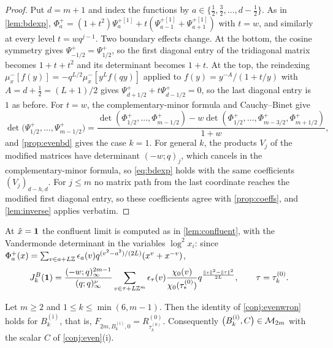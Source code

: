 \begin{proof}
Put $d=m+1$ and index the functions by $a\in\{\frac12,\frac32,\dots,d-\frac12\}$. As in \cref{lem:bdexp}, $\Phi^+_a=(1+t^2)\Psi^{+[1]}_a+t(\Psi^{+[1]}_{a-1}+\Psi^{+[1]}_{a+1})$ with $t=w$, and similarly at every level $t=wq^{j-1}$. Two boundary effects change. At the bottom, the cosine symmetry gives $\Psi^+_{-1/2}=\Psi^+_{1/2}$, so the first diagonal entry of the tridiagonal matrix becomes $1+t+t^2$ and its determinant becomes $1+t$. At the top, the reindexing $\mu^-_x[f(y)]=-q^{L/2}\mu^-_x[y^Lf(qy)]$ applied to $f(y)=y^{-A}/(1+t/y)$ with $A=d+\frac12=(L+1)/2$ gives $\Psi^+_{d+1/2}+t\Psi^+_{d-1/2}=0$, so the last diagonal entry is $1$ as before. For $t=w$, the complementary-minor formula and Cauchy--Binet give
\[
\det\bigl(\Psi^+_{1/2},\dots,\Psi^+_{m-1/2}\bigr)=\frac{\det(\Phi^+_{1/2},\dots,\Phi^+_{m-1/2})-w\det(\Phi^+_{1/2},\dots,\Phi^+_{m-3/2},\Phi^+_{m+1/2})}{1+w},
\]
and \cref{prop:evenbd} gives the case $k=1$. For general $k$, the products $V_j$ of the modified matrices have determinant $(-w;q)_j$, which cancels in the complementary-minor formula, so \eqref{eq:bdexp} holds with the same coefficients $(V_j)_{d-h,d}$. For $j\le m$ no matrix path from the last coordinate reaches the modified first diagonal entry, so these coefficients agree with \cref{prop:coeffs}, and \cref{lem:inverse} applies verbatim.
\end{proof}

At $\hat x=\mathbf{1}$ the confluent limit is computed as in \cref{lem:confluent}, with the Vandermonde determinant in the variables $\log^2x_i$: since $\Phi^+_a(x)=\sum_{v\in a+L\mathbb{Z}}\epsilon_a(v)q^{(v^2-a^2)/(2L)}(x^v+x^{-v})$,
\begin{equation}\label{eq:evenconf}
J^B_k(\mathbf{1})=\frac{(-w;q)_\infty^{2m-1}}{(q;q)_\infty^\nu}\sum_{v\in\tau+L\mathbb{Z}^m}\epsilon_\tau(v)\frac{\chi_0(v)}{\chi_0(\tau^{(0)}_*)}q^{\frac{\|v\|^2-\|\tau\|^2}{2L}},\qquad\tau=\tau^{(0)}_k.
\end{equation}

\begin{theorem}\label{thm:evencomp}
Let $m\ge2$ and $1\le k\le\min(6,m-1)$. Then the identity of \cref{conj:evenwron} holds for $B^{\mathrm{(i)}}_k$, that is, $F_{2m,B^{\mathrm{(i)}}_k,0}=R^{(0)}_{\tau^{(0)}_k}$. Consequently $\bigl(B^{\mathrm{(i)}}_k,C\bigr)\in\mathcal{M}_{2m}$ with the scalar $C$ of \cref{conj:even}(i).
\end{theorem}

